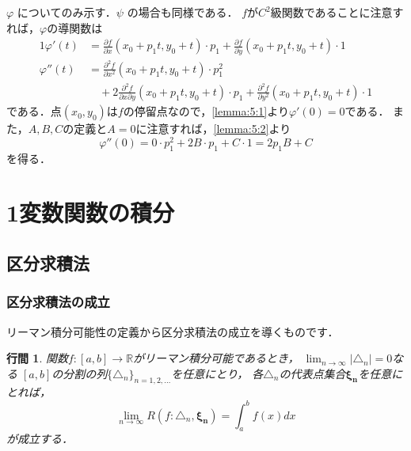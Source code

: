 \documentclass{article}
\makeatletter
\renewenvironment{proof}[1][\proofname]{\par
        \pushQED{\qed}
        \normalfont
        \topsep6\p@\@plus6\p@ \trivlist
        \item[\hskip\labelsep{\bfseries #1}\@addpunct{\bfseries}]\ignorespaces
    }{%
        \popQED\endtrivlist\@endpefalse
    }
\renewcommand{\proofname}{\underline{証明.}}
\newtheorem{lemma}{行間}
\makeatother
\begin{document}
\begin{proof}
    $\varphi$ についてのみ示す．$\psi$ の場合も同様である．
    $f$が$C^2$級関数であることに注意すれば，$\varphi$の導関数は
    \begin{alignat}{1}
        \varphi'(t)
        &=
              \frac{\partial f}{\partial x}(x_0 + p_1 t, y_0 + t) \cdot p_1
            + \frac{\partial f}{\partial y}(x_0 + p_1 t, y_0 + t) \cdot 1 \label{lemma:5:1} \\
        \varphi''(t)
        &=
              \frac{\partial^2 f}{\partial x^2}(x_0 + p_1 t, y_0 + t) \cdot p_1^2 \nonumber \\
        &\quad +
            2 \frac{\partial^2 f}{\partial x \partial y}(x_0 + p_1 t, y_0 + t) \cdot p_1
            + \frac{\partial^2 f}{\partial y^2}(x_0 + p_1 t, y_0 + t) \cdot 1 \label{lemma:5:2}
    \end{alignat}
    である．点$(x_0, y_0)$は$f$の停留点なので，\cref{lemma:5:1}より$\varphi'(0) = 0$である．
    また，$A, B, C$の定義と$A = 0$に注意すれば，\cref{lemma:5:2}より
    \begin{equation}
        \varphi''(0) = 0 \cdot p_1^2 + 2B \cdot p_1 + C \cdot 1 = 2p_1 B + C
    \end{equation}
    を得る．
\end{proof}

\section{1変数関数の積分}
\setcounter{subsection}{1}
\subsection{区分求積法}
\subsubsection{区分求積法の成立}
リーマン積分可能性の定義から区分求積法の成立を導くものです．

\begin{screen}
    \begin{lemma}
        関数$f:[a,b] \rightarrow \mathbb{R}$がリーマン積分可能であるとき，
        $\lim_{n\rightarrow\infty} |\triangle_n| = 0$なる
        $[a, b]$の分割の列$\{\triangle_n\}_{n=1,2,\dots}$を任意にとり，
        各$\triangle_n$の代表点集合$\mathbf{\xi_n}$を任意にとれば，
        \begin{equation}
            \lim_{n\rightarrow\infty} R(f: \triangle_n, \mathbf{\xi_n})
            =
            \int_a^b f(x) dx
        \end{equation}
        が成立する．
    \end{lemma}
\end{screen}
\end{document}
